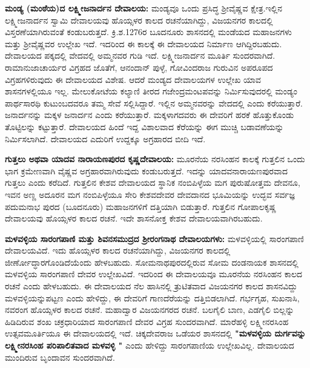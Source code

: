 \vskip 3pt

\textbf{ಮಂಡ್ಯ (ಮಂಠೆಯ)ದ ಲಕ್ಷ್ಮೀಜನಾರ್ದನ ದೇವಾಲಯ:} ಮಂಡ್ಯವೂ ಒಂದು ಪ್ರಸಿದ್ಧ ಶ‍್ರೀವೈಷ್ಣವ ಕ್ಷೇತ್ರ.\break ಇಲ್ಲಿನ ಲಕ್ಷ್ಮೀಜನಾರ್ದನ ಸ್ವಾಮಿ ದೇವಾಲಯವು ಹೊಯ್ಸಳರ ಕಾಲದ ರಚನೆಯಾಗಿದ್ದು, ವಿಜಯನಗರ ಕಾಲದಲ್ಲಿ ವಿಸ್ತರಣೆ\-ಯಾಗಿರು\-ವಂತೆ ಕಂಡುಬರುತ್ತದೆ. ಕ್ರಿ.ಶ.1276ರ ಬೂದನೂರು ಶಾಸನದಲ್ಲಿ ಮಂಡೆಯದ ಮಹಾಜನಗಳು ಮತ್ತು ಶ‍್ರೀವೈಷ್ಣವರ ಉಲ್ಲೇಖ ಇದೆ. ಇದರಿಂದ ಈ ಕಾಲಕ್ಕೆ ಈ ದೇವಾಲಯದ ನಿರ್ಮಾಣ ಆಗಿದ್ದಿರಬಹುದು. ದೇವಾಲಯದ ಪಕ್ಕದಲ್ಲಿ ವೇದವಲ್ಲಿ ಅಮ್ಮನವರ ಗುಡಿ ಇದೆ. ಲಕ್ಷ್ಮೀಜನಾರ್ದನ ಮೂರ್ತಿ ಸುಂದರವಾಗಿದೆ. ರಾಮಾನುಜಾಚಾರ್ಯರ ವಿಗ್ರಹದ ಜೊತೆಗೆ, ಆನಂದಾನ್​ ಪುಳ್ಳೆ, ಗೋವಿಂದರಾಜ ಗುರುವಿನ ಅಪರೂಪದ ವಿಗ್ರಹಗಳಿರುವುದು ಈ ದೇವಾಲಯದ ವಿಶೇಷ. ಆದರೆ ಮಂಡ್ಯದ ದೇವಾಲಯಗಳ ಉಲ್ಲೇಖ ಯಾವ ಶಾಸನಗಳಲ್ಲಿಯೂ ಇಲ್ಲ. ಮೇಲುಕೋಟೆಯ ಕಲ್ಯಾಣಿ ತೀರದ ಗಜೇಂದ್ರಮಂಟಪವನ್ನು ನಿರ್ಮಿಸುವುದರಲ್ಲಿ ಮಂಡ್ಯಂ ಪಾರ್ಥಸಾರಥಿ ಕುಟುಂಬದವರೂ ತಮ್ಮ ಸೇವೆ ಸಲ್ಲಿಸಿದ್ದಾರೆ. ಇಲ್ಲಿನ ಅಮ್ಮನವರನ್ನು ವೇದದಲ್ಲಿ ಎಂದು ಕರೆಯುತ್ತಾರೆ. ಜನಾರ್ದನನ್ನು ಮಕ್ಕಳ ಜನಾರ್ದನ ಎಂದು ಕರೆಯುತ್ತಾರೆ. ಮಕ್ಕಳಾಗದವರು ಈ ದೇವರಿಗೆ ಹರಕೆ ಹೊತ್ತುಕೊಂಡು ತೊಟ್ಟಿಲನ್ನು ಕಟ್ಟುತ್ತಾರೆ. ದೇವಾಲಯದ ಹಿಂದೆ ಇದ್ದ ವಿಶಾಲವಾದ ಕೆರೆಯನ್ನು ಈಗ ಮುಚ್ಚಿ ಬಡಾವಣೆಯನ್ನು ನಿರ್ಮಿಸಲಾಗಿದೆ. ದೇವಾಲಯದ ಎದುರಿಗೆ ಉದ್ದಕ್ಕೂ ಅಗ್ರಹಾರದ ಬೀದಿ ಇದೆ.

\vskip 3pt

\textbf{ಗುತ್ತಲು ಅಥವಾ ಯಾದವ ನಾರಾಯಣಪುರದ ಕೃಷ್ಣದೇವಾಲಯ:} ಮೂರನೆಯ ನರಸಿಂಹನ ಕಾಲಕ್ಕೆ ಗುತ್ತಲಿನ ಒಂದು ಭಾಗ ಕ್ರಮೇಣವಾಗಿ ವೈಷ್ಣವ ಅಗ್ರಹಾರವಾಗಿರುವುದು ಕಂಡುಬರುತ್ತದೆ. ಇದನ್ನು ಯಾದವನಾರಾಯಣಪುರವಾದ ಗುತ್ತಲು ಎಂದು ಕರೆದಿದೆ. ಗುತ್ತಲಿನ ಕೇಶವ ದೇವಾಲಯದ ಸ್ಥಾನಿಕ ನಂಬಿಪಿಳ್ಳೆಯ ಮಗ ಪುರುಷೋತ್ತಮ ದೇವನೂ, ಇವನ ಅಣ್ಣ ಅದೂರನ ಮಗ ನಂಬಿಪಿಳ್ಳೆಯೂ ಸೇರಿ ಕೇಶವದೇವರ ದೇವದಾನದ ಭೂಮಿಯನ್ನು ಉದ್ಭವ ಸರ್ವಜ್ಞ ಪದುಮನಾಭ ಪುರದ (ಬೂದನೂರು) ಮಹಾಜನಗಳಿಗೆ ದತ್ತಿಯಾಗಿ ಬಿಡುತ್ತಾರೆ. ಗುತ್ತಲಿನ ಗೋಪಾಲಕೃಷ್ಣ ದೇವಾಲಯವು ಹೊಯ್ಸಳರ ಕಾಲದ ರಚನೆ. ಇದೇ ಶಾಸನೋಕ್ತ ಕೇಶವ ದೇವಾಲಯವಾಗಿರಬಹುದು.

\vskip 3pt

\textbf{ಮಳವಳ್ಳಿಯ ಸಾರಂಗಪಾಣಿ ಮತ್ತು ಶಿವನಸಮುದ್ರದ ಶ‍್ರೀರಂಗನಾಥ ದೇವಾಲಯಗಳು:} ಮಳವಳ್ಳಿಯಲ್ಲಿ ಸಾರಂಗಪಾಣಿ ದೇವಾಲಯವಿದೆ. ಇದು ಹೊಯ್ಸಳರ ಕಾಲದ ರಚನೆಯಾಗಿದ್ದು, ವಿಜಯನಗರ ಕಾಲದಲ್ಲಿ ಜೀರ್ಣೋದ್ಧಾರ\-ಗೊಂಡಿದೆಯೆಂದು ಹೇಳಬಹುದು. ಸೋಮನಾಥಪುರದಲ್ಲಿರುವ ಸೋಮ ದಂಡನಾಯಕ ಶಾಸನದಲ್ಲಿ ಮಳವಳ್ಳಿಯ ಸಾರಂಗಪಾಣಿ ದೇವರ ಉಲ್ಲೇಖವಿದೆ. ಇದರಿಂದ ಈ ದೇವಾಲಯವೂ ಮೂರನೆಯ ನರಸಿಂಹನ ಕಾಲದ ರಚನೆ ಎಂದು ಹೇಳಬಹುದು. ಈ ದೇವಾಲಯದ ನೆಲ ಹಾಸಿನಲ್ಲಿ ತ್ರುಟಿತವಾದ ವಿಜಯನಗರ ಕಾಲದ ಶಾಸನವಿದ್ದು ಮಳವಳ್ಳಿಯನ್ನು\break ಪಟ್ಟಣ ಎಂದು ಹೇಳಿದ್ದು, ಈ ದೇವರಿಗೆ ಗಾಣದೆರೆಯನ್ನು ದತ್ತಿಬಿಡಲಾಗಿದೆ. ಗರ್ಭಗೃಹ, ಸುಖನಾಸಿ, ನವರಂಗ ಹೊಯ್ಸಳರ ಕಾಲದ ರಚನೆ. ಮಹಾದ್ವಾರ ವಿಜಯನಗರದ ರಚನೆ. ಬಲಗೈಲಿ ಬಾಣ, ಎಡಗೈಲಿ ಬಿಲ್ಲನ್ನು ಹಿಡಿದಿರುವ ಶಂಖ ಚಕ್ರಧಾರಿಯಾದ ಸಾರಂಗಪಾಣಿ ದೇವರ ವಿಗ್ರಹ ಸುಂದರವಾಗಿದೆ. ಮಾರೆಹಳ್ಳಿ ಲಕ್ಷ್ಮೀನರಸಿಂಹ ಉತ್ಸವಮೂರ್ತಿಯೂ ಈ ದೇವಾಲಯದಲ್ಲಿ ಇದೆ. ಚಿಕ್ಕದೇವರಾಜ ಒಡೆಯರ ಶಾಸನದಲ್ಲಿ \textbf{"ಮಳವಳ್ಳಿಯ ದುರ್ಗವನ್ನು ಲಕ್ಷ್ಮೀನರಸಿಂಹ ಪರಿಪಾಲಿತವಾದ ಮಳವಳ್ಳಿ "} ಎಂದು ಹೇಳಿದ್ದು ಸಾರಂಗಪಾಣಿಯ ಉಲ್ಲೇಖವಿಲ್ಲ. ದೇವಾಲಯದ ಮುಂದಿರುವ ಬೃಂದಾವನ ಸುಂದರವಾಗಿದೆ.


